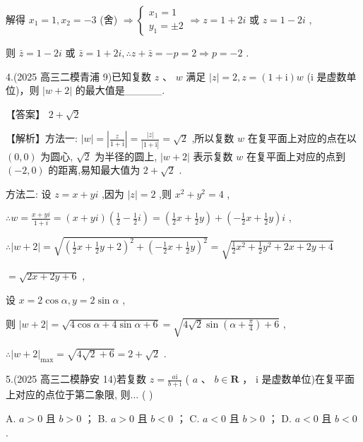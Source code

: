 \documentclass[10pt]{article}
\begin{document}
解得 \({x}_{1} = 1,{x}_{2} =  - 3\) (舍) \(\Rightarrow  \left\{  {\begin{array}{l} {x}_{1} = 1 \\  {y}_{1} =  \pm  2 \end{array} \Rightarrow  z = 1 + {2i}}\right.\) 或 \(z = 1 - {2i}\) ,

则 \(\bar{z} = 1 - {2i}\) 或 \(\bar{z} = 1 + {2i},\therefore z + \bar{z} =  - p = 2 \Rightarrow  p =  - 2\) .

4.(2025 高三二模青浦 9)已知复数 \(z\) 、 \(w\) 满足 \(\left| z\right|  = 2,z = \left( {1 + \mathrm{i}}\right) w\) (i 是虚数单位)，则 \(\left| {w + 2}\right|\) 的最大值是\_\_\_\_\_.

【答案】 \(2 + \sqrt{2}\)

【解析】方法一: \(\left| w\right|  = \left| \frac{z}{1 + \mathrm{i}}\right|  = \frac{\left| z\right| }{\left| 1 + \mathrm{i}\right| } = \sqrt{2}\) ,所以复数 \(w\) 在复平面上对应的点在以 \(\left( {0,0}\right)\) 为圆心, \(\sqrt{2}\) 为半径的圆上, \(\left| {w + 2}\right|\) 表示复数 \(w\) 在复平面上对应的点到 \(\left( {-2,0}\right)\) 的距离,易知最大值为 \(2 + \sqrt{2}\) .

方法二: 设 \(z = x + {yi}\) ,因为 \(\left| z\right|  = 2\) ,则 \({x}^{2} + {y}^{2} = 4\) ,

\(\therefore w = \frac{x + {yi}}{1 + i} = \left( {x + {yi}}\right) \left( {\frac{1}{2} - \frac{1}{2}i}\right)  = \left( {\frac{1}{2}x + \frac{1}{2}y}\right)  + \left( {-\frac{1}{2}x + \frac{1}{2}y}\right) i\) ,

\(\therefore \left| {w + 2}\right|  = \sqrt{{\left( \frac{1}{2}x + \frac{1}{2}y + 2\right) }^{2} + {\left( -\frac{1}{2}x + \frac{1}{2}y\right) }^{2}} = \sqrt{\frac{1}{2}{x}^{2} + \frac{1}{2}{y}^{2} + {2x} + {2y} + 4}\)

\(= \sqrt{{2x} + {2y} + 6}\) ,

设 \(x = 2\cos \alpha ,y = 2\sin \alpha\) ,

则 \(\left| {w + 2}\right|  = \sqrt{4\cos \alpha  + 4\sin \alpha  + 6} = \sqrt{4\sqrt{2}\sin \left( {\alpha  + \frac{\pi }{4}}\right)  + 6}\) ,

\(\therefore {\left| w + 2\right| }_{\max } = \sqrt{4\sqrt{2} + 6} = 2 + \sqrt{2}\) .

5.(2025 高三二模静安 14)若复数 \(z = \frac{a\mathrm{i}}{b + \mathrm{i}}\) ( \(a\text{ 、 }b \in  \mathbf{R}\) ， \(\mathrm{i}\) 是虚数单位)在复平面上对应的点位于第二象限, 则... ( )

A. \(a > 0\) 且 \(b > 0\) ； B. \(a > 0\) 且 \(b < 0\) ； C. \(a < 0\) 且 \(b > 0\) ； D. \(a < 0\) 且 \(b < 0\) .
\end{document}
